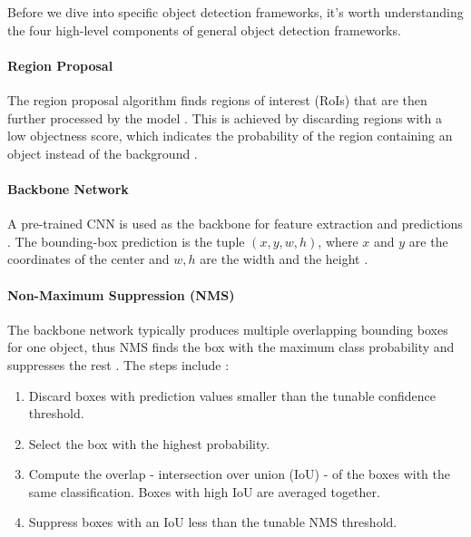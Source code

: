 \documentclass[a4paper, 11pt, oneside]{article}
\begin{document}
\label{sec:generalobjectdetection}

Before we dive into specific object detection frameworks, it's worth understanding the four high-level components of
general object detection frameworks.

\paragraph{Region Proposal}

The region proposal algorithm finds regions of interest (RoIs) that are then further processed by the model
\cite{elgendy2020deep}. This is achieved by discarding regions with a low objectness score, which indicates the probability
of the region containing an object instead of the background \cite{elgendy2020deep}.

\paragraph{Backbone Network}

A pre-trained CNN is used as the backbone for feature extraction and predictions \cite{elgendy2020deep}. The bounding-box
prediction is the tuple $(x, y, w, h)$, where $x$ and $y$ are the coordinates of the center and $w, h$ are the width and
the height \cite{elgendy2020deep}.

\paragraph{Non-Maximum Suppression (NMS)}

The backbone network typically produces multiple overlapping bounding boxes for one object, thus NMS finds
the box with the maximum class probability and suppresses the rest \cite{elgendy2020deep}. The steps include
\cite{elgendy2020deep}:

\begin{enumerate}
  \item Discard boxes with prediction values smaller than the tunable confidence threshold.
  \item Select the box with the highest probability.
  \item Compute the overlap - intersection over union (IoU) - of the boxes with the same classification. Boxes with high
  IoU are averaged together.
  \item Suppress boxes with an IoU less than the tunable NMS threshold.
\end{enumerate}
\end{document}
